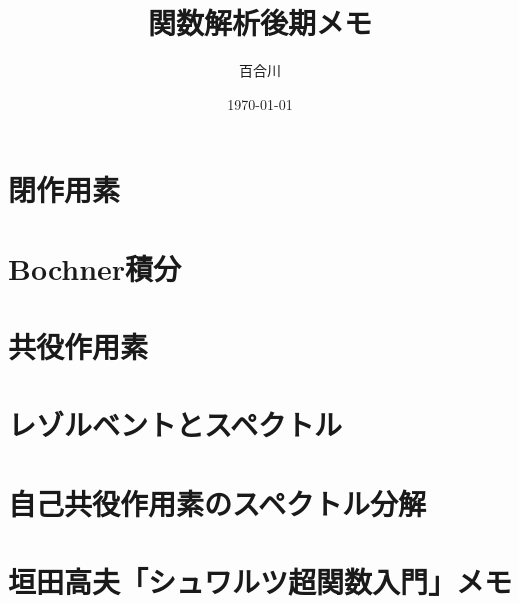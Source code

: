 \documentclass[a4j,10.5pt,oneside,openany]{jsbook}
\title{関数解析後期メモ}
\author{百合川}
\date{\today}
\theoremstyle{mystyle}
\begin{document}
%
%

\maketitle
%
%
\tableofcontents
\frontmatter
%
\mainmatter
%


\chapter{閉作用素}
	
\chapter{Bochner積分}
	
	
	
\chapter{共役作用素}
	
	
\chapter{レゾルベントとスペクトル}
	
	




\chapter{自己共役作用素のスペクトル分解}
	
	
	
	
	
	

\chapter{垣田高夫「シュワルツ超関数入門」メモ}
	
\appendix


\newpage
\printindex
%
%
\end{document}
